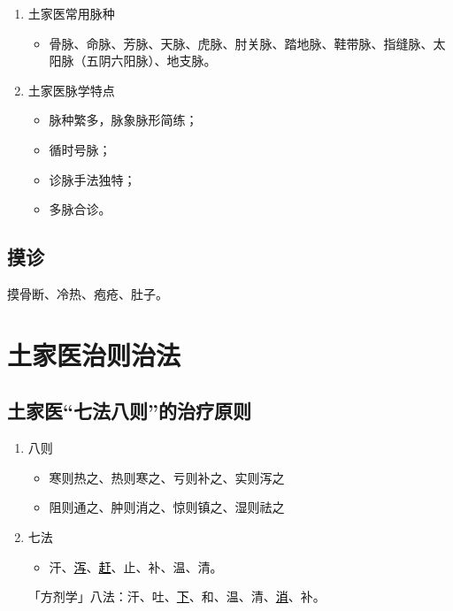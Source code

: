 \documentclass[cn,hazy,black,12pt,normal,founder]{elegantnote}
\newcommand{\redt}[1]{\textcolor{black}{{}#1}}      %
\begin{document}
\begin{enumerate}
  \item 土家医常用脉种
  \begin{itemize}
    \item 骨脉、命脉、芳脉、天脉、虎脉、肘关脉、踏地脉、鞋带脉、指缝脉、太阳脉（五阴六阳脉）、地支脉。
  \end{itemize}
  \item 土家医脉学特点
  \begin{itemize}
    \item 脉种繁多，脉象脉形简练；
    \item 循时号脉；
    \item 诊脉手法独特；
    \item 多脉合诊。
  \end{itemize}
\end{enumerate}

\subsection{摸诊}

摸骨断、冷热、疱疮、肚子。

\section{土家医治则治法}

\subsection{土家医“七法八则”的治疗原则}

\begin{enumerate}
  \item 八则
  \begin{itemize}
    \item 寒则热之、热则寒之、亏则补之、实则泻之
    \item 阻则通之、肿则消之、惊则镇之、湿则祛之
  \end{itemize}
  \item 七法
  \begin{itemize}
    \item 汗、\redt{\uline{泻}}、\redt{\uline{赶}}、止、补、温、清。
  \end{itemize}
  \begin{note}
  「方剂学」八法：汗、吐、\redt{\uline{下}}、和、温、清、\redt{\uline{消}}、补。
  \end{note}
\end{enumerate}
\end{document}
